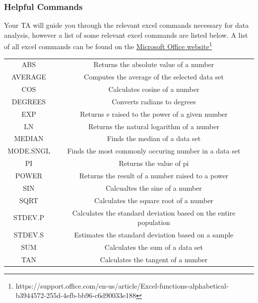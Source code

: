 \subsubsection{Helpful Commands}

Your TA will guide you through the relevant excel commands necessary for data analysis, however a list of some relevant excel commands are listed below. A list of all excel commands can be found on the \href{https://support.office.com/en-us/article/Excel-functions-alphabetical-b3944572-255d-4efb-bb96-c6d90033e188}{Microsoft Office website}\footnote{https://support.office.com/en-us/article/Excel-functions-alphabetical-b3944572-255d-4efb-bb96-c6d90033e188}

\begin{center}
\begin{tabular}{c | c}
ABS & Returns the absolute value of a number \\
AVERAGE & Computes the average of the selected data set \\
COS & Calculates cosine of a number\\
DEGREES & Converts radians to degrees \\
EXP & Returns e raised to the power of a given number \\
LN & Returns the natural logarithm of a number \\
MEDIAN & Finds the median of a data set \\
MODE.SNGL & Finds the most commonly occuring number in a data set\\
PI & Returns the value of pi\\
POWER & Returns the result of a number raised to a power\\
SIN & Calcualtes the sine of a number\\
SQRT & Calculates the square root of a number\\
STDEV.P & Calculates the standard deviation based on the entire population \\
STDEV.S & Estimates the standard deviation based on a sample \\
SUM & Calculates the sum of a data set\\
TAN & Calculates the tangent of a number
\end{tabular}
\end{center}

\newpage
